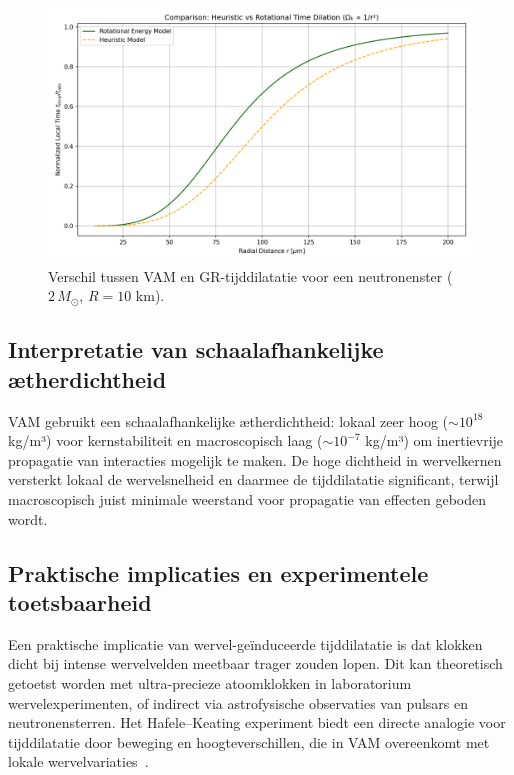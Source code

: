 \begin{figure}[ht!]
    \centering
    \includegraphics[width=0.7\linewidth]{RotationalVsHeuristicTimeDilation}
    \caption{Verschil tussen VAM en GR-tijddilatatie voor een neutronenster ($2\,M_\odot$, $R=10$ km).}
    \label{fig:vergelijkingVAMGR}
\end{figure}

\subsection{Interpretatie van schaalafhankelijke ætherdichtheid}

VAM gebruikt een schaalafhankelijke ætherdichtheid: lokaal zeer hoog ($\sim10^{18}$ kg/m³) voor kernstabiliteit en macroscopisch laag ($\sim10^{-7}$ kg/m³) om inertievrije propagatie van interacties mogelijk te maken. De hoge dichtheid in wervelkernen versterkt lokaal de wervelsnelheid en daarmee de tijddilatatie significant, terwijl macroscopisch juist minimale weerstand voor propagatie van effecten geboden wordt.

\subsection{Praktische implicaties en experimentele toetsbaarheid}

Een praktische implicatie van wervel-geïnduceerde tijddilatatie is dat klokken dicht bij intense wervelvelden meetbaar trager zouden lopen. Dit kan theoretisch getoetst worden met ultra-precieze atoomklokken in laboratorium wervelexperimenten, of indirect via astrofysische observaties van pulsars en neutronensterren. Het Hafele–Keating experiment biedt een directe analogie voor tijddilatatie door beweging en hoogteverschillen, die in VAM overeenkomt met lokale wervelvariaties~\cite{hafele1972around}.
